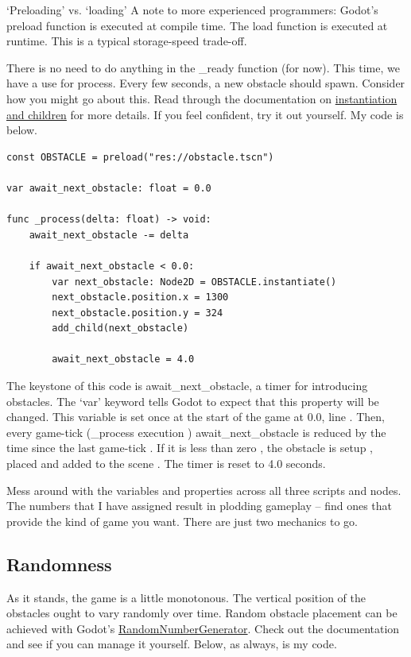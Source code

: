 \documentclass[14pt]{extarticle}
\newcommand{\encircle}[1]{\tikz[baseline=(char.base)]{\node[shape=circle,draw,inner sep=1pt] (char) {#1};}}
\begin{document}
\begin{callout-note}{`Preloading' vs. `loading'}
A note to more experienced programmers: Godot's preload function is executed at compile time. The load function is executed at runtime. This is a typical storage-speed trade-off.
\end{callout-note}

There is no need to do anything in the \_ready function (for now). This time, we have a use for process. Every few seconds, a new obstacle should spawn. Consider how you might go about this. Read through the documentation on \href{https://docs.godotengine.org/en/stable/tutorials/scripting/nodes_and_scene_instances.html}{instantiation and children} for more details. If you feel confident, try it out yourself. My code is below.

\clearpage
\begin{lstlisting}[language=gdscript, label={lst:obstacle-preload}, caption=Preloading the obstacle]
const OBSTACLE = preload("res://obstacle.tscn")

var await_next_obstacle: float = 0.0

func _process(delta: float) -> void:
	await_next_obstacle -= delta
	
	if await_next_obstacle < 0.0:
		var next_obstacle: Node2D = OBSTACLE.instantiate()
		next_obstacle.position.x = 1300
		next_obstacle.position.y = 324
		add_child(next_obstacle)
		
		await_next_obstacle = 4.0
\end{lstlisting}

The keystone of this code is await\_next\_obstacle, a timer for introducing obstacles. The `var' keyword tells Godot to expect that this property will be changed. This variable is set once at the start of the game at 0.0, line \encircle{3}. Then, every game-tick (\_process execution \encircle{5}) await\_next\_obstacle is reduced by the time since the last game-tick \encircle{6}. If it is less than zero \encircle{8}, the obstacle is setup \encircle{9}, placed \encircle{10} \encircle{11} and added to the scene \encircle{12}. The timer is reset to 4.0 seconds.

Mess around with the variables and properties across all three scripts and nodes. The numbers that I have assigned result in plodding gameplay -- find ones that provide the kind of game you want. There are just two mechanics to go.

\subsection*{Randomness}
As it stands, the game is a little monotonous. The vertical position of the obstacles ought to vary randomly over time. Random obstacle placement can be achieved with Godot's \href{https://docs.godotengine.org/en/stable/classes/class_randomnumbergenerator.html}{RandomNumberGenerator}. Check out the documentation and see if you can manage it yourself. Below, as always, is my code.
\end{document}

